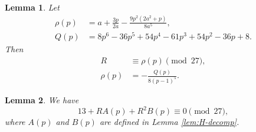 \documentclass[10pt,a4paper]{amsart}
\newtheorem{lemma}{Lemma}
\begin{document}
\begin{lemma}\label{lem:R-mod27}
Let
\begin{align*}
\rho(p)
&=
a+\frac{3p}{2a}
-\frac{9p^2(2a^2+p)}{8a^5},\\
Q(p)
&=
8p^6-36p^5+54p^4-61p^3
+54p^2-36p+8.
\end{align*}
Then
\begin{align*}
R&\equiv\rho(p)\pmod{27},\\
\rho(p)
&=
-\frac{Q(p)}{8(p-1)^5}.
\end{align*}
\end{lemma}

\begin{lemma}\label{lem:main-pk-cong}
We have
\begin{equation*}
13+RA(p)+R^2B(p)\equiv0\pmod{27},
\end{equation*}where $A(p)$ and $B(p)$ are defined in Lemma \ref{lem:H-decomp}.
\end{lemma}
\end{document}

